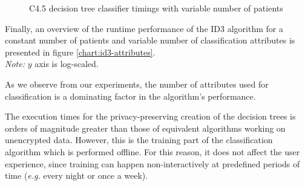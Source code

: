 \begin{figure}[H]
  \centering
\begin{minipage}{.5\linewidth}
  \centering
{}
\caption{C4.5 decision tree classifier timings with variable number of patients}\label{chart:c45-patients}
\end{minipage}
\end{figure}

Finally, an overview of the runtime performance of the ID3 algorithm for a constant number of patients and variable number of classification attributes is presented in figure \ref{chart:id3-attributes}.\\ \textit{Note:} $y$ axis is log\hyp scaled.

As we observe from our experiments, the number of attributes used for classification is a dominating factor in the algorithm's performance.

The execution times for the privacy\hyp preserving creation of the decision trees is orders of magnitude greater than those of equivalent algorithms working on unencrypted data.
However, this is the training part of the classification algorithm which is performed offline.
For this reason, it does not affect the user experience, since training can happen non\hyp interactively at predefined periods of time (\textit{e.g.} every night or once a week).



